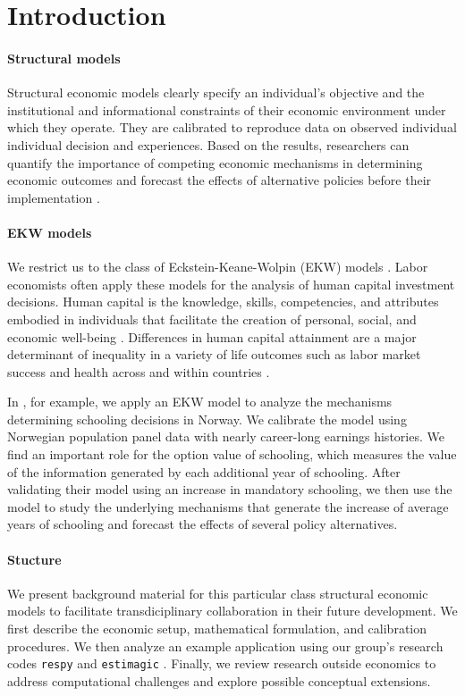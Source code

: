 \section{Introduction}
\paragraph{Structural models}  Structural economic models clearly specify an individual's objective and the institutional and informational constraints of their economic environment under which they operate. They are calibrated to reproduce data on observed individual individual decision and experiences. Based on the results, researchers can quantify the importance of competing economic mechanisms in determining economic outcomes and forecast the effects of alternative policies before their implementation \citep{Wolpin.2013}.

\paragraph{EKW models} We restrict us to the class of Eckstein-Keane-Wolpin (EKW) models \citep{Keane.1997,Blundell.2016,Adda.2017}. Labor economists often apply these models for the analysis of human capital investment decisions. Human capital is the knowledge, skills, competencies, and attributes embodied in individuals that facilitate the creation of personal, social, and economic well-being \citep{Becker.1964}. Differences in human capital attainment are a major determinant of inequality in a variety of life outcomes such as labor market success and health across and within countries \citep{OECD.2001}.

In \citet{Bhuller.2018}, for example, we apply an EKW model to analyze the mechanisms determining schooling decisions in Norway. We calibrate the model using Norwegian population panel data with nearly career-long earnings histories. We find an important role for the option value of schooling, which measures the value of the information generated by each additional year of schooling. After validating their model using an increase in mandatory schooling, we then use the model to study the underlying mechanisms that generate the increase of average years of schooling and forecast the effects of several policy alternatives.

\paragraph{Stucture}  We present background material for this particular class structural economic models to facilitate transdiciplinary collaboration in their future development. We first describe the economic setup, mathematical formulation, and calibration procedures. We then analyze an example application using our group's research codes \verb+respy+  \citep{respy-1.0} and \verb+estimagic+ \citep{Gabler.2019}. Finally, we review research outside economics to address computational challenges and explore possible conceptual extensions.

